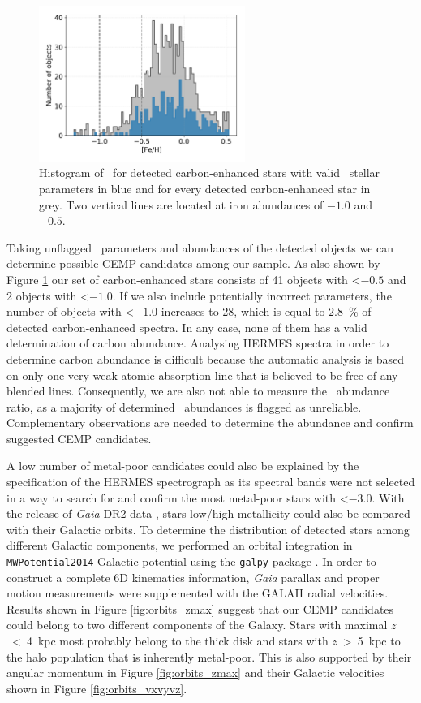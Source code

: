 \begin{figure}
	\centering
	\includegraphics[width=0.6\textwidth]{Fe_H_cannon.png}
	\caption{Histogram of \Feh\ for detected carbon-enhanced stars with valid \TC\ stellar parameters in blue and for every detected carbon-enhanced star in grey. Two vertical lines are located at iron abundances of $-1.0$ and $-0.5$.}
	\label{fig:feh_candidates}
\end{figure}

Taking unflagged \TC\ parameters and abundances of the detected objects we can determine possible CEMP candidates among our sample. As also shown by Figure \ref{fig:feh_candidates} our set of carbon-enhanced stars consists of 41 objects with \Feh \textless $-0.5$ and 2 objects with \Feh \textless $-1.0$. If we also include potentially incorrect parameters, the number of objects with \Feh \textless $-1.0$ increases to 28, which is equal to $2.8$~\% of detected carbon-enhanced spectra. In any case, none of them has a valid determination of carbon abundance. Analysing HERMES spectra in order to determine carbon abundance is difficult because the automatic analysis is based on only one very weak atomic absorption line that is believed to be free of any blended lines. Consequently, we are also not able to measure the \CO\ abundance ratio, as a majority of determined \Cfe\ abundances is flagged as unreliable. Complementary observations are needed to determine the abundance and confirm suggested CEMP candidates.

A low number of metal-poor candidates could also be explained by the specification of the HERMES spectrograph as its spectral bands were not selected in a way to search for and confirm the most metal-poor stars with \Feh \textless $-3.0$. With the release of {\it Gaia} DR2 data \cite{2018A&A...616A...1G}, stars low/high-metallicity could also be compared with their Galactic orbits. To determine the distribution of detected stars among different Galactic components, we performed an orbital integration in \texttt{MWPotential2014} Galactic potential using the \texttt{galpy} package \cite{2015ApJS..216...29B}. In order to construct a complete 6D kinematics information, {\it Gaia} parallax and proper motion measurements were supplemented with the GALAH radial velocities. Results shown in Figure \ref{fig:orbits_zmax} suggest that our CEMP candidates could belong to two different components of the Galaxy. Stars with maximal $z$~<~4~kpc most probably belong to the thick disk and stars with $z$~>~5~kpc to the halo population that is inherently metal-poor. This is also supported by their angular momentum in Figure \ref{fig:orbits_zmax} and their Galactic velocities shown in Figure \ref{fig:orbits_vxvyvz}.

